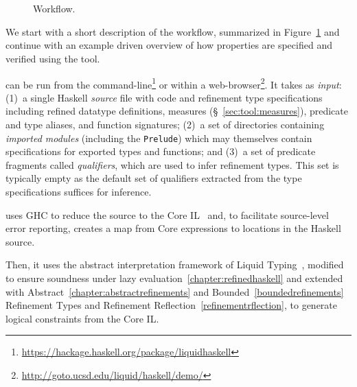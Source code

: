 \section{\toolname}\label{sec:liquidhaskell}
\begin{figure}[t!]
\centering
\captionsetup{justification=centering}
\noindent{}
\caption{\toolname Workflow.}
	\label{fig:internals}
\end{figure}
% 
%
We start with a short description of the \toolname workflow,
summarized in Figure~\ref{fig:internals} and continue with an 
example driven overview of how properties are specified
and verified using the tool. 

\toolname can be run from the command-line\footnote{\url{https://hackage.haskell.org/package/liquidhaskell}}
or within a web-browser\footnote{\url{http://goto.ucsd.edu/liquid/haskell/demo/}}.
It takes as \emph{input}:
%
(1)~a single Haskell \emph{source} file with code and refinement
    type specifications including refined datatype definitions, 
    measures (\S~\ref{sec:tool:measures}), predicate and type 
    aliases, and function signatures;
%
(2)~a set of directories containing \emph{imported modules} 
    (including the \verb+Prelude+) which may themselves 
    contain specifications for exported types and functions; and
%
(3)~a set of predicate fragments called \emph{qualifiers},
    which are used to infer refinement types. This set is 
    typically empty as the default set of qualifiers extracted 
    from the type specifications suffices for inference.

\toolname uses GHC to reduce the source to the Core IL~\cite{SulzmannCJD07}
and, to facilitate source-level error reporting, creates a map from Core 
expressions to locations in the Haskell source.

Then, it uses the abstract interpretation framework of Liquid Typing~\cite{LiquidPLDI08}, 
modified to ensure soundness under lazy evaluation~\ref{chapter:refinedhaskell}
and extended with Abstract~\ref{chapter:abstractrefinements}
and Bounded~\ref{boundedrefinements} Refinement Types
and Refinement Reflection~\ref{refinementrflection},
to generate logical constraints from the Core IL.
     

